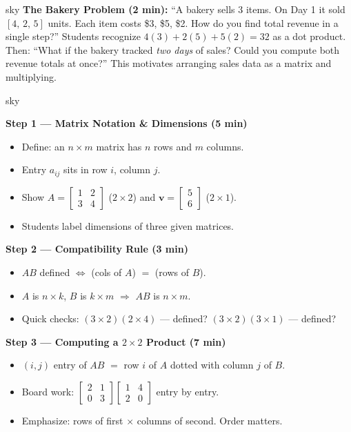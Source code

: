 \documentclass[10pt]{article}
\begin{document}
\begin{skillbox}[Hook]{sky}
    \textbf{The Bakery Problem (2 min):} ``A bakery sells 3 items. On Day 1 it
    sold $[4,\,2,\,5]$ units. Each item costs \$3, \$5, \$2. How do you find total
    revenue in a single step?'' Students recognize $4(3)+2(5)+5(2)=32$ as a dot
    product. Then: ``What if the bakery tracked \textit{two days} of sales? Could
    you compute both revenue totals at once?'' This motivates arranging sales data
    as a matrix and multiplying.
\end{skillbox}

\begin{skillbox}[Lesson]{sky}
    \begin{multicols}{2}

    \textbf{Step 1 --- Matrix Notation \& Dimensions (5 min)}
    \begin{itemize}\setlength{\itemsep}{2pt}
        \item Define: an $n \times m$ matrix has $n$ rows and $m$ columns.
        \item Entry $a_{ij}$ sits in row $i$, column $j$.
        \item Show $A = \begin{bmatrix}1&2\\3&4\end{bmatrix}$ ($2\times 2$) and
              $\mathbf{v} = \begin{bmatrix}5\\6\end{bmatrix}$ ($2\times 1$).
        \item Students label dimensions of three given matrices.
    \end{itemize}

    \textbf{Step 2 --- Compatibility Rule (3 min)}
    \begin{itemize}\setlength{\itemsep}{2pt}
        \item $AB$ defined $\Leftrightarrow$ (cols of $A$) $=$ (rows of $B$).
        \item $A$ is $n\times k$, $B$ is $k\times m$ $\Rightarrow$ $AB$ is $n\times m$.
        \item Quick checks: $(3\times 2)(2\times 4)$ --- defined? $(3\times 2)(3\times 1)$ --- defined?
    \end{itemize}

    \columnbreak

    \textbf{Step 3 --- Computing a $2\times 2$ Product (7 min)}
    \begin{itemize}\setlength{\itemsep}{2pt}
        \item $(i,j)$ entry of $AB$ $=$ row $i$ of $A$ dotted with column $j$ of $B$.
        \item Board work: $\begin{bmatrix}2&1\\0&3\end{bmatrix}\begin{bmatrix}1&4\\2&0\end{bmatrix}$ entry by entry.
        \item Emphasize: rows of first $\times$ columns of second. Order matters.
    \end{itemize}


\end{multicols}
\end{skillbox}
\end{document}
